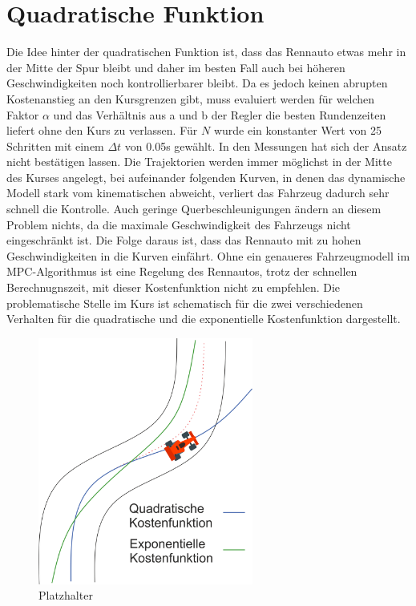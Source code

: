 \documentclass{like}
\begin{document}
\begin{figure}
	\centering
	 
	\caption{}
	\label{fig:deltaTMaxB}
\end{figure}


\section{Quadratische Funktion}
Die Idee hinter der quadratischen Funktion ist, dass das Rennauto etwas mehr in der Mitte der Spur bleibt und daher im besten Fall auch bei höheren Geschwindigkeiten noch kontrollierbarer bleibt. Da es jedoch keinen abrupten Kostenanstieg an den Kursgrenzen gibt, muss evaluiert werden für welchen Faktor $\alpha$ und das Verhältnis aus a und b der Regler die besten Rundenzeiten liefert ohne den Kurs zu verlassen. Für $N$ wurde ein konstanter Wert von 25 Schritten mit einem $\Delta t$ von 0.05s gewählt. In den Messungen hat sich der Ansatz nicht bestätigen lassen. Die Trajektorien werden immer möglichst in der Mitte des Kurses angelegt, bei aufeinander folgenden Kurven, in denen das dynamische Modell stark vom kinematischen abweicht, verliert das Fahrzeug dadurch sehr schnell die Kontrolle. Auch geringe Querbeschleunigungen ändern an diesem Problem nichts, da die maximale Geschwindigkeit des Fahrzeugs nicht eingeschränkt ist. Die Folge daraus ist, dass das Rennauto mit zu hohen Geschwindigkeiten in die Kurven einfährt. Ohne ein genaueres Fahrzeugmodell im \ac{MPC}-Algorithmus ist eine Regelung des Rennautos, trotz der schnellen Berechnugnszeit, mit dieser Kostenfunktion nicht  zu empfehlen.
Die problematische Stelle im Kurs ist schematisch für die zwei verschiedenen Verhalten für die quadratische und die exponentielle Kostenfunktion dargestellt. 

\begin{figure}[ht!]
	\centering
	\includegraphics[width=200pt]{Abbildungen/quadraticCostFunction.png}
	\caption{Platzhalter}
	\label{fig:quadraticCostFunct}
\end{figure}
\end{document}
